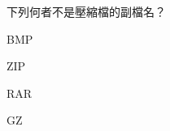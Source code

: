 \ifx\ntpcNinetyThree\undefined[93學年基北區] \fi
下列何者不是壓縮檔的副檔名？
  \begin{optionlist}
  \item BMP\label{ntpc-93-a19}
  \item ZIP
  \item RAR
  \item GZ
  \end{optionlist}